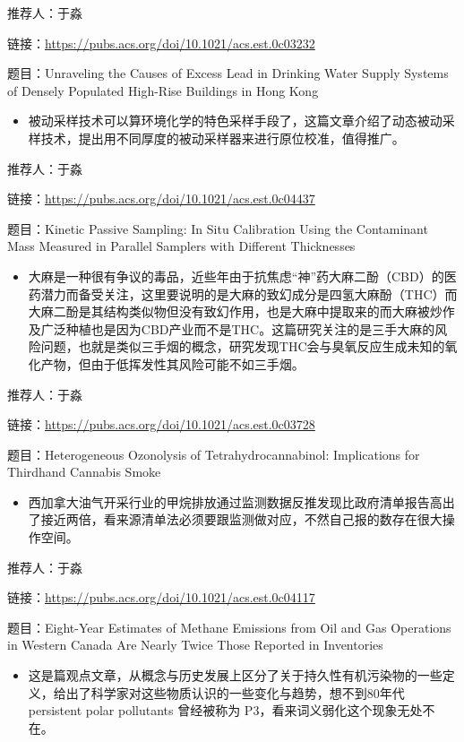 \documentclass[
]{book}
\providecommand{\tightlist}{%
  \setlength{\itemsep}{0pt}\setlength{\parskip}{0pt}}
\begin{document}
推荐人：于淼

链接：\url{https://pubs.acs.org/doi/10.1021/acs.est.0c03232}

题目：Unraveling the Causes of Excess Lead in Drinking Water Supply Systems of Densely Populated High-Rise Buildings in Hong Kong

\begin{itemize}
\tightlist
\item
  被动采样技术可以算环境化学的特色采样手段了，这篇文章介绍了动态被动采样技术，提出用不同厚度的被动采样器来进行原位校准，值得推广。
\end{itemize}

推荐人：于淼

链接：\url{https://pubs.acs.org/doi/10.1021/acs.est.0c04437}

题目：Kinetic Passive Sampling: In Situ Calibration Using the Contaminant Mass Measured in Parallel Samplers with Different Thicknesses

\begin{itemize}
\tightlist
\item
  大麻是一种很有争议的毒品，近些年由于抗焦虑``神''药大麻二酚（CBD）的医药潜力而备受关注，这里要说明的是大麻的致幻成分是四氢大麻酚（THC）而大麻二酚是其结构类似物但没有致幻作用，也是大麻中提取来的而大麻被炒作及广泛种植也是因为CBD产业而不是THC。这篇研究关注的是三手大麻的风险问题，也就是类似三手烟的概念，研究发现THC会与臭氧反应生成未知的氧化产物，但由于低挥发性其风险可能不如三手烟。
\end{itemize}

推荐人：于淼

链接：\url{https://pubs.acs.org/doi/10.1021/acs.est.0c03728}

题目：Heterogeneous Ozonolysis of Tetrahydrocannabinol: Implications for Thirdhand Cannabis Smoke

\begin{itemize}
\tightlist
\item
  西加拿大油气开采行业的甲烷排放通过监测数据反推发现比政府清单报告高出了接近两倍，看来源清单法必须要跟监测做对应，不然自己报的数存在很大操作空间。
\end{itemize}

推荐人：于淼

链接：\url{https://pubs.acs.org/doi/10.1021/acs.est.0c04117}

题目：Eight-Year Estimates of Methane Emissions from Oil and Gas Operations in Western Canada Are Nearly Twice Those Reported in Inventories

\begin{itemize}
\tightlist
\item
  这是篇观点文章，从概念与历史发展上区分了关于持久性有机污染物的一些定义，给出了科学家对这些物质认识的一些变化与趋势，想不到80年代 persistent polar pollutants 曾经被称为 P3，看来词义弱化这个现象无处不在。
\end{itemize}
\end{document}

